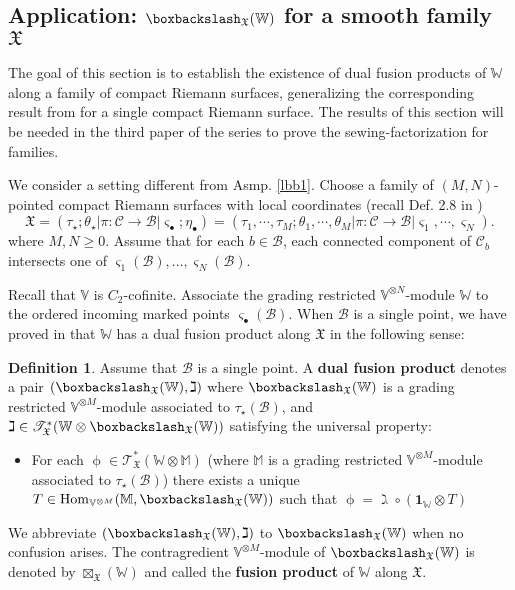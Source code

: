 \documentclass[11pt,b5paper,notitlepage]{article}
\theoremstyle{definition}
\newtheorem{df}{Definition}[section]
\theoremstyle{plain}
\newcommand{\idt}{\mathbf{1}}
\newcommand{\Hom}{\mathrm{Hom}}
\newcommand{\scr}{\mathscr}
\newcommand{\sgm}{\varsigma}
\newcommand{\blt}{\bullet}
\newcommand{\Vbb}{\mathbb V}
\newcommand{\Wbb}{\mathbb W}
\newcommand{\Mbb}{\mathbb M}
\newcommand{\<}{\left\langle}
\renewcommand{\>}{\right\rangle}
\newcommand{\MC}{\mathcal{C}}
\newcommand{\MB}{\mathcal{B}}
\newcommand{\fx}{\mathfrak{X}}
\newcommand{\bbs}{\boxbackslash}
\numberwithin{equation}{section}
\begin{document}
\subsection{Application: $\bbs_\fx(\Wbb)$ for a smooth family $\fx$}


The goal of this section is to establish the existence of dual fusion products of $\Wbb$ along a family of compact Riemann surfaces, generalizing the corresponding result from \cite{GZ1} for a single compact Riemann surface. The results of this section will be needed in the third paper of the series to prove the sewing-factorization for families.


We consider a setting different from Asmp. \ref{lbb1}. Choose a family of $(M,N)$-pointed compact Riemann surfaces with local coordinates (recall Def. 2.8 in \cite{GZ1})
$$
\fx=(\tau_\star;\theta_\star\big| \pi:\MC\rightarrow \MB\big| \varsigma_\blt;\eta_\blt)=(\tau_1,\cdots,\tau_M;\theta_1,\cdots,\theta_M\big| \pi:\MC\rightarrow \MB\big| \varsigma_1,\cdots,\varsigma_N).
$$
where $M,N\geq0$. Assume that for each $b\in\MB$, each connected component of $\MC_b$ intersects one of $\sgm_1(\MB),\dots,\sgm_N(\MB)$. 

Recall that $\Vbb$ is $C_2$-cofinite. Associate the grading restricted $\Vbb^{\otimes N}$-module $\Wbb$ to the ordered incoming marked points $\sgm_\blt(\MB)$. When $\MB$ is a single point, we have proved in \cite[Thm. 3.31]{GZ1} that $\Wbb$ has a dual fusion product along $\fx$ in the following sense:

\begin{df}\label{lbb36}
Assume that $\MB$ is a single point. A \textbf{dual fusion product} denotes a pair $(\bbs_\fx(\Wbb),\gimel)$ where $\bbs_\fx(\Wbb)$ is a grading restricted $\Vbb^{\otimes M}$-module associated to $\tau_\star(\MB)$, and $\gimel\in\scr T_\fx^*(\Wbb\otimes\bbs_\fx(\Wbb))$ satisfying the universal property:
\begin{itemize}
\item For each $\upphi\in\scr T_\fx^*(\Wbb\otimes\Mbb)$ (where $\Mbb$ is a grading restricted $\Vbb^{\otimes M}$-module associated to $\tau_\star(\MB)$) there exists a unique $T\in\Hom_{\Vbb^{\otimes M}}(\Mbb,\bbs_\fx(\Wbb))$ such that $\upphi=\gimel\circ(\idt_\Wbb\otimes T)$
\end{itemize}
We abbreviate $(\bbs_\fx(\Wbb),\gimel)$ to $\bbs_\fx(\Wbb)$ when no confusion arises. The contragredient $\Vbb^{\otimes M}$-module of $\bbs_\fx(\Wbb)$ is denoted by $\boxtimes_\fx(\Wbb)$ and called the \textbf{fusion product} of $\Wbb$ along $\fx$.
\end{df}
\end{document}
